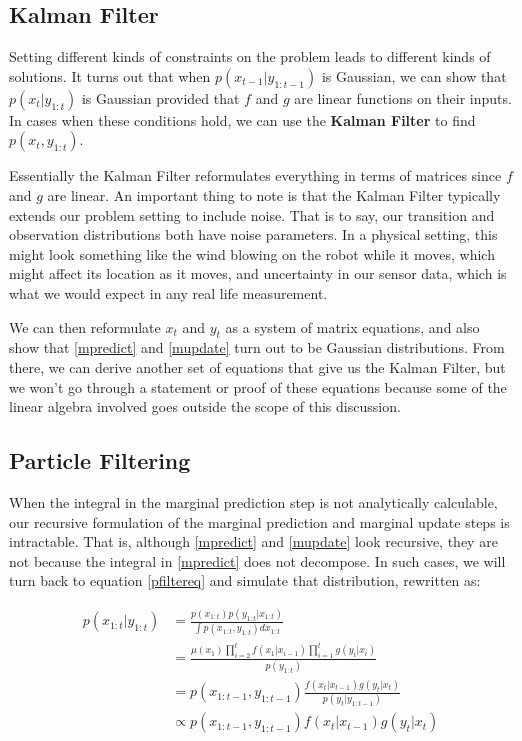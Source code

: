 \documentclass{article}
\begin{document}
\subsection{Kalman Filter} \label{sec:kalman}

Setting different kinds of constraints on the problem leads to different kinds of solutions. It turns out that when $p(x_{t-1}|y_{1:t-1})$ is Gaussian, we can show that $p(x_{t}|y_{1:t})$ is Gaussian provided that $f$ and $g$ are linear functions on their inputs. In cases when these conditions hold, we can use the \textbf{Kalman Filter} to find $p(x_{t},y_{1:t})$.

Essentially the Kalman Filter reformulates everything in terms of matrices since $f$ and $g$ are linear. An important thing to note is that the Kalman Filter typically extends our problem setting to include noise. That is to say, our transition and observation distributions both have noise parameters. In a physical setting, this might look something like the wind blowing on the robot while it moves, which might affect its location as it moves, and uncertainty in our sensor data, which is what we would expect in any real life measurement.

We can then reformulate $x_t$ and $y_t$ as a system of matrix equations, and also show that \eqref{mpredict} and \eqref{mupdate} turn out to be Gaussian distributions. From there, we can derive another set of equations that give us the Kalman Filter, but we won't go through a statement or proof of these equations because some of the linear algebra involved goes outside the scope of this discussion.

\subsection{Particle Filtering} \label{sec:pfiltering}
When the integral in the marginal prediction step is not analytically calculable, our recursive formulation of the marginal prediction and marginal update steps is intractable. That is, although \eqref{mpredict} and \eqref{mupdate} look recursive, they are not because the integral in \eqref{mpredict} does not decompose. In such cases, we will turn back to equation \eqref{pfiltereq} and simulate that distribution, rewritten as:

\begin{equation}
\begin{split}
p(x_{1:t}|y_{1:t}) &= \frac{p(x_{1:t}) p(y_{1:t}|x_{1:t})}{\int p(x_{1:t},y_{1:t}) dx_{1:t}}\\
&= \frac{\mu(x_1)\prod_{i=2}^{t} f(x_1|x_{i-1})\prod_{i=1}^{t} g(y_i|x_i)}{p(y_{1:t})} \\
&= p(x_{1:t-1},y_{1:t-1}) \frac{f(x_t|x_{t-1})g(y_t|x_t)}{p(y_t|y_{1:t-1})} \\
&\propto p(x_{1:t-1},y_{1:t-1}) f(x_t|x_{t-1})g(y_t|x_t)
\end{split}
\end{equation}
\end{document}
